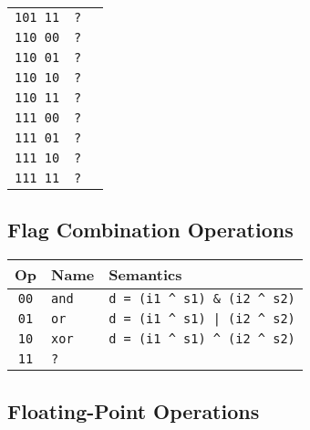 \documentclass[10pt,DIV12]{scrartcl}
\begin{document}
\begin{tabular}{cll}
\texttt{101 11} & \texttt{?} & \\
\texttt{110 00} & \texttt{?} & \\
\texttt{110 01} & \texttt{?} & \\
\texttt{110 10} & \texttt{?} & \\
\texttt{110 11} & \texttt{?} & \\
\texttt{111 00} & \texttt{?} & \\
\texttt{111 01} & \texttt{?} & \\
\texttt{111 10} & \texttt{?} & \\
\texttt{111 11} & \texttt{?} & \\
\bottomrule  
\end{tabular}

\subsection{Flag Combination Operations}
\label{sec:comb}

\begin{tabular}{cll}
\toprule
Op & Name & Semantics \\
\midrule
\texttt{00} & \texttt{and} & \texttt{d = (i1 \textasciicircum{} s1) \& (i2 \textasciicircum{} s2)} \\
\texttt{01} & \texttt{or} & \texttt{d = (i1 \textasciicircum{} s1) | (i2 \textasciicircum{} s2)} \\
\texttt{10} & \texttt{xor} & \texttt{d = (i1 \textasciicircum{} s1) \textasciicircum{} (i2 \textasciicircum{} s2)} \\
\texttt{11} & \texttt{?} & \\
\bottomrule  
\end{tabular}


\pagebreak

\subsection{Floating-Point Operations}
\label{sec:fop}
\end{document}
